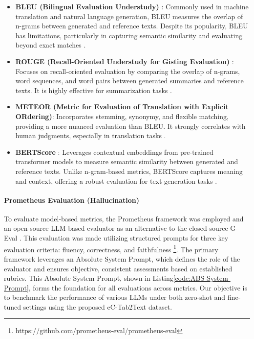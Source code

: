 \begin{itemize} 
    \item \textbf{BLEU (Bilingual Evaluation Understudy)} \citep{Papineni02bleu:a}: Commonly used in machine translation and natural language generation, BLEU measures the overlap of n-grams between generated and reference texts. Despite its popularity, BLEU has limitations, particularly in capturing semantic similarity and evaluating beyond exact matches \citep{Reiter2018A}. 
    \item \textbf{ROUGE (Recall-Oriented Understudy for Gisting Evaluation)} \citep{lin-2004-rouge}: Focuses on recall-oriented evaluation by comparing the overlap of n-grams, word sequences, and word pairs between generated summaries and reference texts. It is highly effective for summarization tasks \citep{Ganesan2015ROUGE}.
    \item \textbf{METEOR (Metric for Evaluation of Translation with Explicit ORdering)}\citep{10.5555/1626355.1626389}: Incorporates stemming, synonymy, and flexible matching, providing a more nuanced evaluation than BLEU. It strongly correlates with human judgments, especially in translation tasks \citep{Dobre2015ACB}. 
    \item \textbf{BERTScore} \citep{zhang2020bertscoreevaluatingtextgeneration}: Leverages contextual embeddings from pre-trained transformer models to measure semantic similarity between generated and reference texts. Unlike n-gram-based metrics, BERTScore captures meaning and context, offering a robust evaluation for text generation tasks \citep{zhang2020bertscoreevaluatingtextgeneration}.
\end{itemize}

\paragraph{Prometheus Evaluation (Hallucination)} 
\label{appendix:Prometheus}
To evaluate model-based metrics, the Prometheus framework \citep{kim2024prometheus2opensource} was employed and an open-source LLM-based evaluator as an alternative to the closed-source G-Eval \cite{liu2023gevalnlgevaluationusing}. This evaluation was made utilizing structured prompts for three key evaluation criteria: fluency, correctness, and faithfulness \footnote{https://github.com/prometheus-eval/prometheus-eval}. The primary framework leverages an Absolute System Prompt, which defines the role of the evaluator and ensures objective, consistent assessments based on established rubrics. This Absolute System Prompt, shown in Listing\ref{code:ABS-System-Prompt}, forms the foundation for all evaluations across metrics. Our objective is to benchmark the performance of various LLMs under both zero-shot and fine-tuned settings using the proposed eC-Tab2Text dataset. 

